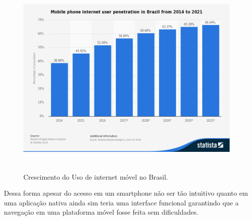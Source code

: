 \begin{figure}[htb]
\includegraphics[height=10cm]{figuras/mobile_internet}
\caption{\label{fig:mobile_internet} Crescimento do Uso de internet móvel no Brasil.}
\end{figure}
\par Dessa forma apesar do acesso em um smartphone não ser tão intuitivo quanto em uma aplicação nativa ainda sim teria uma interface funcional garantindo que a navegação em uma plataforma móvel fosse feita sem  dificuldades.
